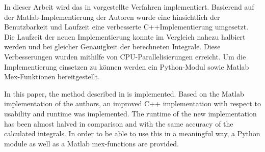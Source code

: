 \kurzfassung



In dieser Arbeit wird das in  vorgestellte Verfahren implementiert. Basierend auf der Matlab-Implementierung der Autoren wurde eine hinsichtlich der Benutzbarkeit und Laufzeit eine verbesserte C++Implementierung umgesetzt.
Die Laufzeit der neuen Implementierung konnte im Vergleich nahezu halbiert werden und bei gleicher Genauigkeit der berechneten Integrale.  
Diese Verbesserungen wurden mithilfe von CPU-Parallelisierungen erreicht. 
Um die Implementierung einsetzen zu können werden ein Python-Modul sowie Matlab Mex-Funktionen bereitgestellt.


\kurzfassungEN

In this paper, the method described in 
is implemented. Based on the Matlab implementation of the
authors, an improved C++ implementation with respect to usability and runtime was implemented. The runtime of the new implementation has been
almost halved in comparison and with the same accuracy of the calculated
integrals. In order to be able to use this in a meaningful way, a Python module as well as a
Matlab mex-functions are provided.